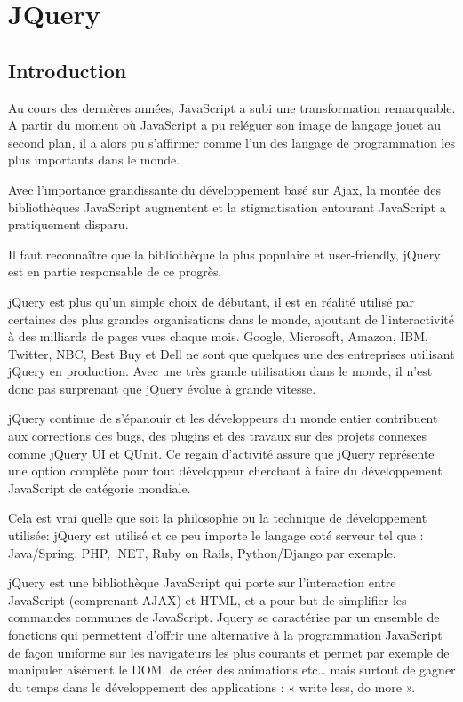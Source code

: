 \section{JQuery}
\label{ch:jQuery}

\subsection{Introduction}

Au cours des dernières années, JavaScript a subi une transformation remarquable. A partir du moment où JavaScript a pu reléguer son image de langage jouet au second plan, il a  alors pu s'affirmer comme l'un des langage de programmation les plus importants dans le monde.

Avec l'importance grandissante du développement basé sur Ajax, la montée des bibliothèques JavaScript augmentent et la stigmatisation entourant JavaScript a pratiquement disparu.

Il faut reconnaître que la bibliothèque la plus populaire et user-friendly, jQuery est en partie responsable de ce progrès.

jQuery est plus qu'un simple choix de débutant, il est en réalité utilisé par certaines des plus grandes organisations dans le monde, ajoutant de l'interactivité à des milliards de pages vues chaque mois. Google, Microsoft, Amazon, IBM, Twitter, NBC, Best Buy et Dell ne sont que quelques une des entreprises utilisant jQuery en production. Avec une très grande utilisation dans le monde, il n'est donc pas surprenant que jQuery évolue à grande vitesse.

jQuery continue de s'épanouir et les développeurs du monde entier contribuent aux corrections des bugs, des plugins et des travaux sur des projets connexes comme jQuery UI et QUnit. Ce regain d'activité assure que jQuery représente une option complète pour tout développeur cherchant à faire du développement JavaScript de catégorie mondiale.

Cela est vrai quelle que soit la philosophie ou la technique de développement utilisée: jQuery est utilisé et ce peu importe le langage coté serveur tel que : Java/Spring, PHP, .NET, Ruby on Rails, Python/Django par exemple.

jQuery est une bibliothèque JavaScript qui porte sur l'interaction entre JavaScript (comprenant AJAX) et HTML, et a pour but de simplifier les commandes communes de JavaScript. Jquery se caractérise par un ensemble de fonctions qui permettent d’offrir une alternative à la programmation JavaScript de façon uniforme sur les navigateurs les plus courants et permet par exemple de manipuler aisément le DOM, de créer des animations etc… mais surtout de gagner du temps dans le développement des applications : « write less, do more ».

